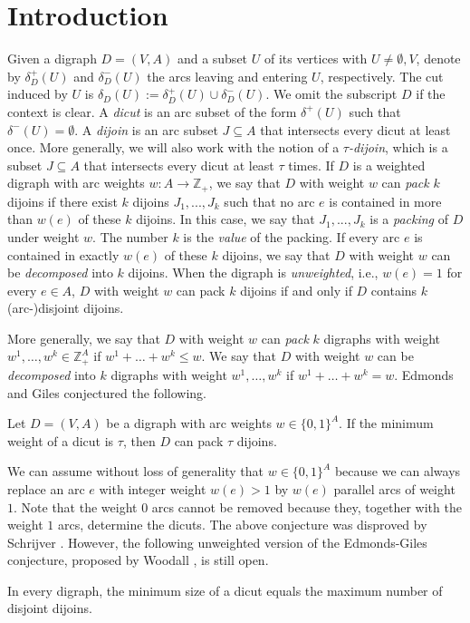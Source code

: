 \documentclass[runningheads]{llncs}
\begin{document}
\section{Introduction}
Given a digraph $D=(V,A)$ and a subset $U$ of its vertices with $U\neq\emptyset , V$, denote by $\delta_D^+(U)$ and $\delta_D^-(U)$ the arcs leaving and entering $U$, respectively. The cut induced by $U$ is $\delta_D(U):=\delta_D^+(U)\cup \delta_D^-(U)$. We omit the subscript $D$ if the context is clear. 
A \textit{dicut} is an arc subset of the form $\delta^+(U)$ such that $\delta^-(U)=\emptyset$. A \textit{dijoin} is an arc subset $J\subseteq A$ that intersects every dicut at least once. 
More generally, we will also work with the notion of a \textit{$\tau$-dijoin}, which is a subset $J\subseteq A$ that intersects every dicut at least $\tau$ times. If $D$ is a weighted digraph with arc weights $w:A\rightarrow \mathbb{Z}_+$, we say that $D$ with weight $w$ can \textit{pack} $k$ dijoins if there exist $k$ dijoins $J_1,...,J_k$ such that no arc $e$ is contained in more than $w(e)$ of these $k$ dijoins.
In this case, we say that $J_1,...,J_k$ is a \textit{packing} of $D$ under weight $w$. The number $k$ is the \textit{value} of the packing. If every arc $e$ is contained in exactly $w(e)$ of these $k$ dijoins, we say that $D$ with weight $w$ can be 
 \emph{decomposed} into $k$ dijoins. When the digraph is \textit{unweighted}, i.e., $w(e)=1$ for every $e\in A$, $D$ with weight $w$ can pack $k$ dijoins if and only if $D$ contains $k$ (arc-)disjoint dijoins.
 
 More generally, we say that $D$ with weight $w$ can \emph{pack} $k$ digraphs with weight $w^1, \ldots, w^k \in \mathbb{Z}^A_+$ if $w^1 + \ldots + w^k\leq w$. We say that $D$ with weight $w$ can be \emph{decomposed} into $k$ digraphs with weight $w^1, \ldots , w^k$ if  $w^1 + \ldots + w^k=w$.
Edmonds and Giles \cite{edmonds1977min} conjectured the following.
\begin{conjecture}\label{conj:E-G}
    Let $D=(V,A)$ be a digraph with arc weights $w\in\{0,1\}^A$. If the minimum weight of a dicut is $\tau$, then $D$ can pack $\tau$ dijoins.
\end{conjecture}
We can assume without loss of generality that $w\in\{0,1\}^A$ because we can always replace an arc $e$ with integer weight $w(e)>1$ by $w(e)$ parallel arcs of weight $1$. Note that the weight $0$ arcs cannot be removed because they, together with the weight $1$ arcs, determine the dicuts.
The above conjecture was disproved by Schrijver \cite{schrijver1980counterexample}. However,
the following unweighted version of the Edmonds-Giles conjecture, proposed by Woodall \cite{woodall1978menger},  is still open.
\begin{conjecture}[Woodall]\label{conj:Woodall}
    In every digraph, the minimum size of a dicut equals the maximum number of disjoint dijoins.
\end{conjecture}
\end{document}
